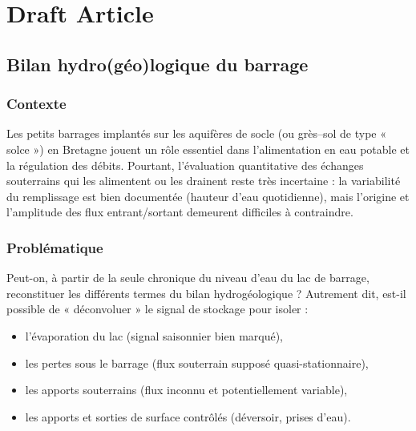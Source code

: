 
\chapter{Draft Article}
\label{chap:draft_article}

\minitableofcontents

\newpage


\section{Bilan hydro(géo)logique du barrage}
\label{sec:bilan_hydrologique_barrage}

\subsection{Contexte}
\label{sec:contexte}

Les petits barrages implantés sur les aquifères de socle (ou grès–sol de type « solce ») en Bretagne jouent un rôle essentiel dans l’alimentation en eau potable et la régulation des débits. Pourtant, l’évaluation quantitative des échanges souterrains qui les alimentent ou les drainent reste très incertaine : la variabilité du remplissage est bien documentée (hauteur d’eau quotidienne), mais l’origine et l’amplitude des flux entrant/sortant demeurent difficiles à contraindre.

\subsection{Problématique}
\label{sec:problematique}

Peut-on, à partir de la seule chronique du niveau d’eau du lac de barrage, reconstituer les différents termes du bilan hydrogéologique ? Autrement dit, est-il possible de « déconvoluer » le signal de stockage pour isoler :
\begin{itemize}[leftmargin=1.5em]
    \item l’évaporation du lac (signal saisonnier bien marqué),
    \item les pertes sous le barrage (flux souterrain supposé quasi-stationnaire),
    \item les apports souterrains (flux inconnu et potentiellement variable),
    \item les apports et sorties de surface contrôlés (déversoir, prises d’eau).
\end{itemize}

